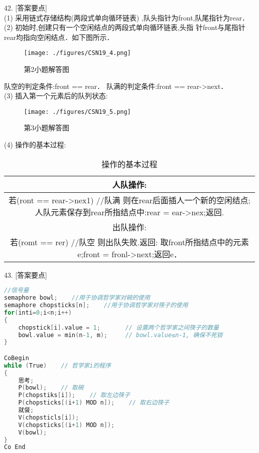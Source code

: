 42. [答案要点] \\
(1) 采用链式存储结构(两段式单向循环链表) ,队头指针为front,队尾指针为rear． \\
(2) 初始时,创建只有一个空闲结点的两段式单向循环链表,头指
针front与尾指针rear均指向空闲结点．如下图所示．
\begin{figure}[ht]
\centering
\texttt{[image: ./figures/CSN19\_4.png]}
\caption{第2小题解答图} \label{CSN19_fig4}
\end{figure}
队空的判定条件:front == rear．
队满的判定条件:front == rear->next． \\
(3) 插入第一个元素后的队列状态:
\begin{figure}[ht]
\centering
\texttt{[image: ./figures/CSN19\_5.png]}
\caption{第3小题解答图} \label{CSN19_fig5}
\end{figure}
(4) 操作的基本过程: \\
\begin{table}[ht]
\centering
\caption{操作的基本过程}\label{CSN19_tab1}
\begin{tabular}{|c|}
\hline
人队操作: \\
\hline
若(ront == rear->nex1)    //队满
则在rear后面插人一个新的空闲结点;
人队元素保存到rear所指结点中:rear = ear->nex;返回. \\
\hline
出队操作: \\
\hline
若(romt == rer)    //队空
则出队失败.返回:
取front所指结点中的元素e;front = fronl->next;返回e． \\
\hline
\end{tabular}
\end{table}

43. [答案要点]
\begin{lstlisting}[language=cpp]
//信号量
semaphore bowl;    //用于协调哲学家对碗的使用
semaphore chopsticks[n];    //用于协调哲学家对筷子的使用
for(inti=0;i<n;i++)
{
    chopstick[i].value = 1;       // 设置两个哲学家之间筷子的数量
    bowl.value = min(n-1, m);     // bowl.value≤n-1, 确保不死锁
}

CoBegin
while (True)    // 哲学家i的程序
{
    思考;
    P(bowl);    // 取碗
    P(chopstiks[i]);    // 取左边筷子
    P(chopsticks[(i+1) MOD n]);    // 取右边筷子
    就餐;
    V(chopsticls[i]);
    V(chopsticks[(i+1) MOD n]);
    V(bowl);
}
Co End
\end{lstlisting}

